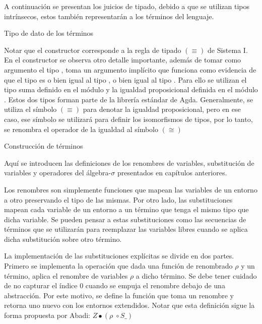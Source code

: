 A continuación se presentan los juicios de tipado, debido a que se utilizan tipos intrínsecos, estos también representarán a los términos del lenguaje.

\begin{codigo}
	Tipo de dato de los términos
	
\end{codigo}

Notar que el constructor  corresponde a la regla de tipado $(\equiv)$ de Sistema I.
En el constructor \const{$\pi$} se observa otro detalle importante, además de tomar como argumento el tipo , toma un argumento implícito que funciona como evidencia de que el tipo  es o bien igual al tipo , o bien igual al tipo .
Para ello se utilizan el tipo suma \type{$\_\uplus\_$} definido en el módulo  y la igualdad proposicional \type{$\_\cong\_$} definida en el módulo .
Estos dos tipos forman parte de la librería estándar de Agda.
Generalmente, se utiliza el símbolo $(\equiv)$ para denotar la igualdad proposicional, pero en ese caso, ese símbolo se utilizará para definir los isomorfismos de tipos, por lo tanto, se renombra el operador de la igualdad al símbolo $(\cong)$

\begin{example}
	Construcción de términos
\end{example}

Aquí se introducen las definiciones de los renombres de variables, substitución de variables y operadores del álgebra-$\sigma$ presentados en capítulos anteriores.


Los renombres son simplemente funciones que mapean las variables de un entorno a otro preservando el tipo de las mismas.
Por otro lado, las substituciones mapean cada variable de un entorno a un término que tenga el mismo tipo que dicha variable.
Se pueden pensar a estas substituciones como las secuencias de términos que se utilizarán para reemplazar las variables libres cuando se aplica dicha substitución sobre otro término. 

La implementación de las substituciones explícitas se divide en dos partes.
Primero se implementa la operación  que dada una función de renombrado $\rho$ y un término, aplica el renombre de variables $\rho$ a dicho término.
Se debe tener cuidado de no capturar el índice 0 cuando se empuja el renombre debajo de una abstracción.
Por este motivo, se define la función  que toma un renombre y retorna uno nuevo con los entornos extendidos.
Notar que esta definición sigue la forma propuesta por Abadi: $Z \bullet (\rho \; \circ S\_)$

